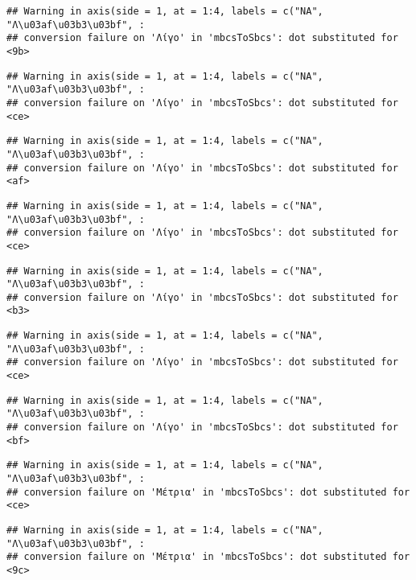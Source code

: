 \documentclass[
]{article}
\begin{document}
\begin{verbatim}
## Warning in axis(side = 1, at = 1:4, labels = c("NA", "Λ\u03af\u03b3\u03bf", :
## conversion failure on 'Λίγο' in 'mbcsToSbcs': dot substituted for <9b>
\end{verbatim}

\begin{verbatim}
## Warning in axis(side = 1, at = 1:4, labels = c("NA", "Λ\u03af\u03b3\u03bf", :
## conversion failure on 'Λίγο' in 'mbcsToSbcs': dot substituted for <ce>
\end{verbatim}

\begin{verbatim}
## Warning in axis(side = 1, at = 1:4, labels = c("NA", "Λ\u03af\u03b3\u03bf", :
## conversion failure on 'Λίγο' in 'mbcsToSbcs': dot substituted for <af>
\end{verbatim}

\begin{verbatim}
## Warning in axis(side = 1, at = 1:4, labels = c("NA", "Λ\u03af\u03b3\u03bf", :
## conversion failure on 'Λίγο' in 'mbcsToSbcs': dot substituted for <ce>
\end{verbatim}

\begin{verbatim}
## Warning in axis(side = 1, at = 1:4, labels = c("NA", "Λ\u03af\u03b3\u03bf", :
## conversion failure on 'Λίγο' in 'mbcsToSbcs': dot substituted for <b3>
\end{verbatim}

\begin{verbatim}
## Warning in axis(side = 1, at = 1:4, labels = c("NA", "Λ\u03af\u03b3\u03bf", :
## conversion failure on 'Λίγο' in 'mbcsToSbcs': dot substituted for <ce>
\end{verbatim}

\begin{verbatim}
## Warning in axis(side = 1, at = 1:4, labels = c("NA", "Λ\u03af\u03b3\u03bf", :
## conversion failure on 'Λίγο' in 'mbcsToSbcs': dot substituted for <bf>
\end{verbatim}

\begin{verbatim}
## Warning in axis(side = 1, at = 1:4, labels = c("NA", "Λ\u03af\u03b3\u03bf", :
## conversion failure on 'Μέτρια' in 'mbcsToSbcs': dot substituted for <ce>
\end{verbatim}

\begin{verbatim}
## Warning in axis(side = 1, at = 1:4, labels = c("NA", "Λ\u03af\u03b3\u03bf", :
## conversion failure on 'Μέτρια' in 'mbcsToSbcs': dot substituted for <9c>
\end{verbatim}
\end{document}
